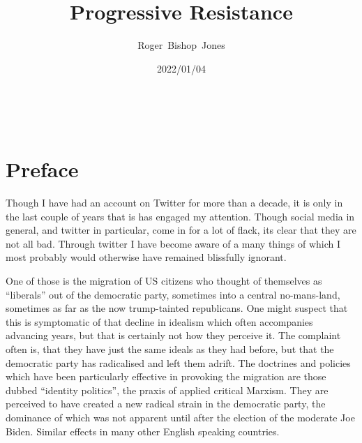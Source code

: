 \documentclass[10pt,titlepage]{article}
\title{\LARGE\bf Progressive Resistance}
\author{Roger~Bishop~Jones}
\date{\small 2022/01/04}
\newcommand{\ignore}[1]{}
\begin{document}
                               
\begin{titlepage}
\maketitle





\end{titlepage}

\ \

\ignore{
\begin{centering}
{}
\end{centering}
}%

\setcounter{tocdepth}{2}
{\parskip-0pt\tableofcontents}


\pagebreak

\section*{Preface}


Though I have had an account on Twitter for more than a decade, it is only in the last couple of years that is has engaged my attention.
Though social media in general, and twitter in particular, come in for a lot of flack, its clear that they are not all bad.
Through twitter I have become aware of a many things of which I most probably would otherwise have remained blissfully ignorant.

One of those is the migration of US citizens who thought of themselves as ``liberals'' out of the democratic party, sometimes into a central no-mans-land, sometimes as far as the now trump-tainted republicans.
One might suspect that this is symptomatic of that decline in idealism which often accompanies advancing years, but that is certainly not how they perceive it.
The complaint often is, that they have just the same ideals as they had before, but that the democratic party has radicalised and left them adrift.
The doctrines and policies which have been particularly effective in provoking the migration are those dubbed ``identity politics'', the praxis of applied critical Marxism.
They are perceived to have created a new radical strain in the democratic party, the dominance of which was not apparent until after the election of the moderate Joe Biden.
Similar effects in many other English speaking countries.
\end{document}
